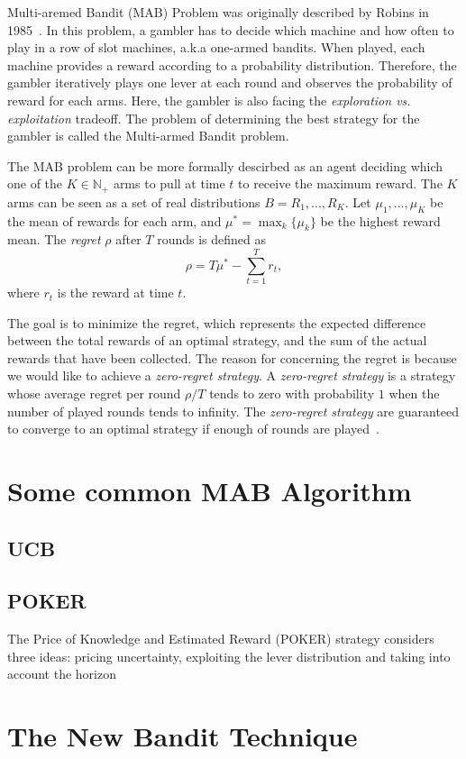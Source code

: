 Multi-aremed Bandit (MAB) Problem was originally described by Robins in 1985~\cite{Robbins:1985:MAB}.
In this problem, a gambler has to decide which machine and how often to play in a row of slot machines, a.k.a one-armed bandits. 
When played, each machine provides a reward according to a probability distribution.
Therefore, the gambler iteratively plays one lever at each round and observes the probability of reward for each arms.
Here, the gambler is also facing the \textit{exploration vs. exploitation} tradeoff.
The problem of determining the best strategy for the gambler is called the Multi-armed Bandit problem.


The MAB problem can be more formally descirbed as 
an agent deciding which one of the $K \in \mathbb{N}_+$ arms to pull at time $t$ to receive the maximum reward.
The $K$ arms can be seen as a set of real distributions $B = {R_1, ..., R_K}$.
Let $\mu_1, ..., \mu_K$ be the mean of rewards for each arm, and $\mu^* = \max_{k} \{ \mu_k \}$ be the highest reward mean.
The \textit{regret} $\rho$ after $T$ rounds is defined as
\begin{displaymath}
\rho = T\mu^* - \sum_{t=1}^{T} r_t,
\end{displaymath}
where $r_t$ is the reward at time $t$.

The goal is to minimize the regret, which represents the expected difference between the total rewards of an optimal strategy,
and the sum of the actual rewards that have been collected.  
The reason for concerning the regret is because we would like to achieve a \textit{zero-regret strategy}.
A \textit{zero-regret strategy} is a strategy whose average regret per round $\rho / T$ tends to zero with probability $1$ 
when the number of played rounds tends to infinity.
The \textit{zero-regret strategy} are guaranteed to converge to an optimal strategy if enough of rounds are played~\cite{Vermorel:2005:MAB}.



\section{Some common MAB Algorithm}



\subsection{UCB}

\subsection{POKER}
The Price of Knowledge and Estimated Reward (POKER) strategy considers three ideas: pricing uncertainty, exploiting the lever distribution and taking into account the horizon


\section{The New Bandit Technique}



